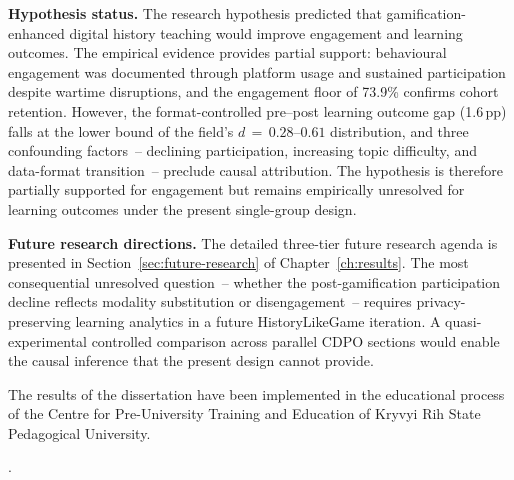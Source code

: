 {\begin{enumerate}
\end{enumerate}

\textbf{Hypothesis status.}
The research hypothesis predicted that gamification-enhanced digital history teaching
would improve engagement and learning outcomes. The empirical evidence provides partial
support: behavioural engagement was documented through platform usage and sustained
participation despite wartime disruptions, and the engagement floor of 73.9\% confirms
cohort retention. However, the format-controlled pre--post learning outcome gap
(1.6\,pp) falls at the lower bound of the field's $d\,{=}\,0.28$--$0.61$ distribution,
and three confounding factors~-- declining participation, increasing topic difficulty,
and data-format transition~-- preclude causal attribution. The hypothesis is therefore
partially supported for engagement but remains empirically unresolved for learning outcomes
under the present single-group design.

\textbf{Future research directions.}
The detailed three-tier future research agenda is presented in Section~\ref{sec:future-research} of
Chapter~\ref{ch:results}. The most consequential unresolved question~-- whether the post-gamification
participation decline reflects modality substitution or disengagement~-- requires
privacy-preserving learning analytics in a future HistoryLikeGame iteration. A
quasi-experimental controlled comparison across parallel CDPO sections would enable the
causal inference that the present design cannot provide.

The results of the dissertation have been implemented in the educational process of the
Centre for Pre-University Training and Education of Kryvyi Rih State Pedagogical University.

.
\label{end_main_text}
}
